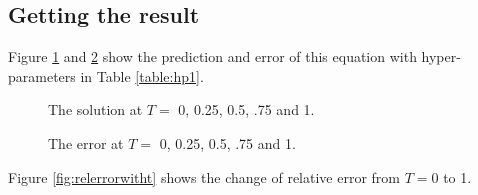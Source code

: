 \documentclass[11pt, a4paper]{article}
\begin{document}
    \subsection{Getting the result}

    Figure \ref{fig:sol} and \ref{fig:error} show the prediction and error of this equation with hyper-parameters in Table \ref{table:hp1}.
    
    \begin{figure}[htb!]
        \caption{The solution at $T=$ 0, 0.25, 0.5, .75 and 1.}
        \label{fig:sol}
    \end{figure}

    \begin{figure}[ht!]
        \caption{The error at $T=$ 0, 0.25, 0.5, .75 and 1.}
        \label{fig:error}
    \end{figure}


    Figure \ref{fig:relerrorwitht} shows the change of relative error from $T=0$ to 1. 
\end{document}
